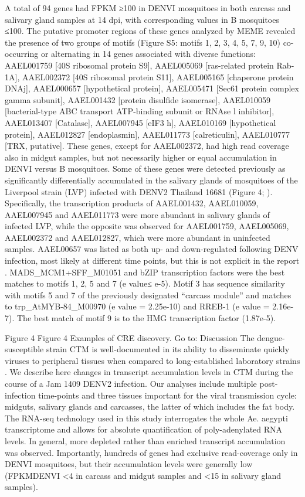 A total of 94 genes had FPKM ≥100 in DENVI mosquitoes in both carcass and salivary gland samples at 14 dpi, with corresponding values in B mosquitoes ≤100.
The putative promoter regions of these genes analyzed by MEME revealed the presence of two groups of motifs (Figure S5: motifs 1, 2, 3, 4, 5, 7, 9, 10) co-occurring or alternating in 14 genes associated with diverse functions: AAEL001759 [40S ribosomal protein S9], AAEL005069 [ras-related protein Rab-1A], AAEL002372 [40S ribosomal protein S11], AAEL005165 [chaperone protein DNAj], AAEL000657 [hypothetical protein], AAEL005471 [Sec61 protein complex gamma subunit], AAEL001432 [protein disulfide isomerase], AAEL010059 [bacterial-type ABC transport ATP-binding subunit or RNAse l inhibitor], AAEL013407 [Catalase], AAEL007945 [eIF3 h], AAEL010169 [hypothetical protein], AAEL012827 [endoplasmin], AAEL011773 [calreticulin], AAEL010777 [TRX, putative].
These genes, except for AAEL002372, had high read coverage also in midgut samples, but not necessarily higher or equal accumulation in DENVI versus B mosquitoes.
Some of these genes were detected previously as significantly differentially accumulated in the salivary glands of mosquitoes of the Liverpool strain (LVP) infected with DENV2 Thailand 16681 (Figure 4; \cite{Luplertlop2011}).
Specifically, the transcription products of AAEL001432, AAEL010059, AAEL007945 and AAEL011773 were more abundant in salivary glands of infected LVP, while the opposite was observed for AAEL001759, AAEL005069, AAEL002372 and AAEL012827, which were more abundant in uninfected samples.
AAEL00657 was listed as both up- and down-regulated following DENV infection, most likely at different time points, but this is not explicit in the report \cite{Luplertlop2011}.
MADS\_MCM1+SFF\_M01051 and bZIP transcription factors were the best matches to motifs 1, 2, 5 and 7 (e value≤ e-5).
Motif 3 has sequence similarity with motifs 5 and 7 of the previously designated “carcass module” and matches to trp\_AtMYB-84\_M00970 (e value = 2.25e-10) and RREB-1 (e value = 2.16e-7).
The best match of motif 9 is to the HMG transcription factor (1.87e-5).

Figure 4
Figure 4
Examples of CRE discovery.
Go to:
Discussion
The dengue-susceptible strain CTM is well-documented in its ability to disseminate quickly viruses to peripheral tissues when compared to long-established laboratory strains \cite{Salazar2007}.
We describe here changes in transcript accumulation levels in CTM during the course of a Jam 1409 DENV2 infection.
Our analyses include multiple post-infection time-points and three tissues important for the viral transmission cycle: midguts, salivary glands and carcasses, the latter of which includes the fat body.
The RNA-seq technology used in this study interrogates the whole Ae. aegypti transcriptome and allows for absolute quantification of poly-adenylated RNA levels.
In general, more depleted rather than enriched transcript accumulation was observed.
Importantly, hundreds of genes had exclusive read-coverage only in DENVI mosquitoes, but their accumulation levels were generally low (FPKMDENVI <4 in carcass and midgut samples and <15 in salivary gland samples).

